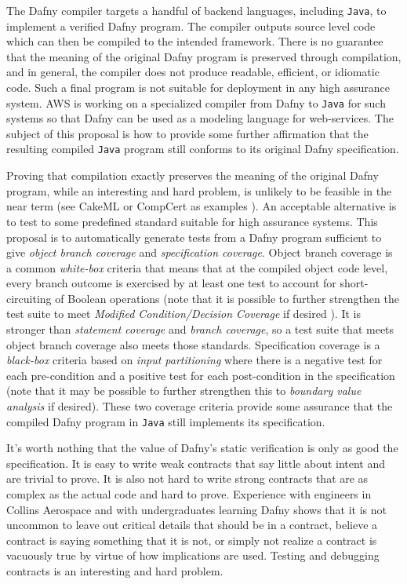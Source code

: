\documentclass[11pt,onecolumn,notitlepage]{article}
\begin{document}
The Dafny compiler targets a handful of backend languages, including \texttt{Java}, to implement a verified Dafny program. The compiler outputs source level code which can then be compiled to the intended framework. There is no guarantee that the meaning of the original Dafny program is preserved through compilation, and in general, the compiler does not produce readable, efficient, or idiomatic code. Such a final program is not suitable for deployment in any high assurance system. AWS is working on a specialized compiler from Dafny to \texttt{Java} for such systems so that Dafny can be used as a modeling language for web-services.  The subject of this proposal is how to provide some further affirmation that the resulting compiled \texttt{Java} program still conforms to its original Dafny specification. 

Proving that compilation exactly preserves the meaning of the original Dafny program, while an interesting and hard problem, is unlikely to be feasible in the near term (see CakeML or CompCert as examples \cite{cakeml, compcert}). An acceptable alternative is to test to some predefined standard suitable for high assurance systems. This proposal is to automatically generate tests from a Dafny program sufficient to give \emph{object branch coverage} and \emph{specification coverage}. Object branch coverage is a common \emph{white-box} criteria that means that at the compiled object code level, every branch outcome is exercised by at least one test to account for short-circuiting of Boolean operations (note that it is possible to further strengthen the test suite to meet \emph{Modified Condition/Decision Coverage} if desired \cite{7194601}). It is stronger than \emph{statement coverage} and \emph{branch coverage}, so a test suite that meets object branch coverage also meets those standards. Specification coverage is a \emph{black-box} criteria based on \emph{input partitioning} where there is a negative test for each pre-condition and a positive test for each post-condition in the specification (note that it may be possible to further strengthen this to \emph{boundary value analysis} if desired). These two coverage criteria provide some assurance that the compiled Dafny program in \texttt{Java} still implements its specification.

It's worth nothing that the value of Dafny's static verification is only as good the specification. It is easy to write weak contracts that say little about intent and are trivial to prove. It is also not hard to write strong contracts that are as complex as the actual code and hard to prove. Experience with engineers in Collins Aerospace and with undergraduates learning Dafny shows that it is not uncommon to leave out critical details that should be in a contract, believe a contract is saying something that it is not, or simply not realize a contract is vacuously true by virtue of how implications are used. Testing and debugging contracts is an interesting and hard problem. 
\end{document}
